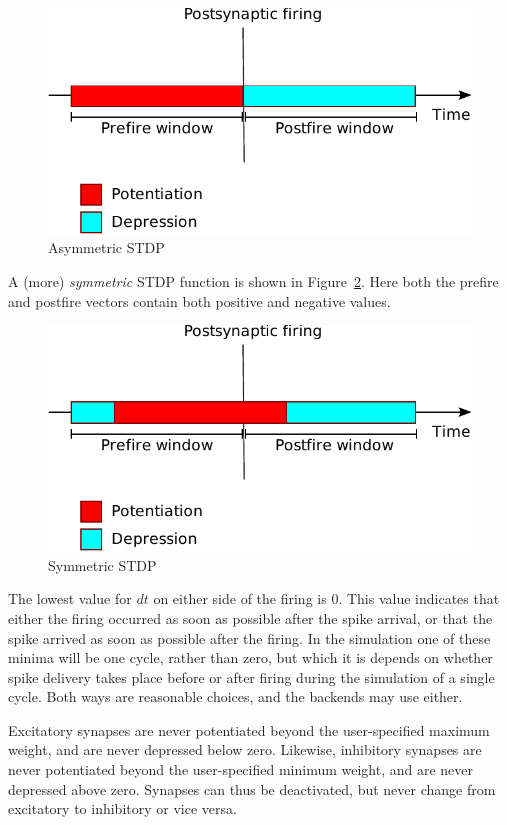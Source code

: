 \documentclass[a4paper]{article}
\begin{document}
\begin{figure}[ht]
	\centering\includegraphics[width=.8\textwidth]{figures/stdp/asymmetric}
	\caption{Asymmetric STDP}
	\label{fig:asymmetric}
\end{figure}

A (more) \emph{symmetric} STDP function is shown in Figure~\ref{fig:symmetric}.  
Here both the prefire and postfire vectors contain both positive and negative values.

\begin{figure}
	\centering\includegraphics[width=.8\textwidth]{figures/stdp/symmetric}
	\caption{Symmetric STDP}
	\label{fig:symmetric}
\end{figure}

The lowest value for $dt$ on either side of the firing is 0. 
This value indicates that either the firing occurred as soon as possible after the spike
arrival, 
	or that the spike arrived as soon as possible after the firing. 
In the simulation one of these minima will be one cycle,
	rather than zero, but which it is depends on whether spike delivery takes place before or after firing during
the simulation of a single cycle. 
Both ways are reasonable choices, and the backends may use either.

Excitatory synapses are never potentiated beyond the user-specified maximum weight,
	and are never depressed below zero.
Likewise, inhibitory synapses are never potentiated beyond the  user-specified minimum weight,
	and are never depressed above zero.
Synapses can thus be deactivated, but never change from excitatory to inhibitory or vice versa.
\end{document}
